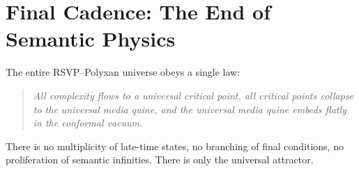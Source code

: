 \section{Final Cadence: The End of Semantic Physics}

The entire RSVP--Polyxan universe obeys a single law:

\begin{quote}
\emph{All complexity flows to a universal critical point,  
all critical points collapse to the universal media quine,  
and the universal media quine embeds flatly in the conformal vacuum.}
\end{quote}

There is no multiplicity of late-time states, no branching of final conditions, no proliferation of semantic infinities.  
There is only the universal attractor.

\bigskip
